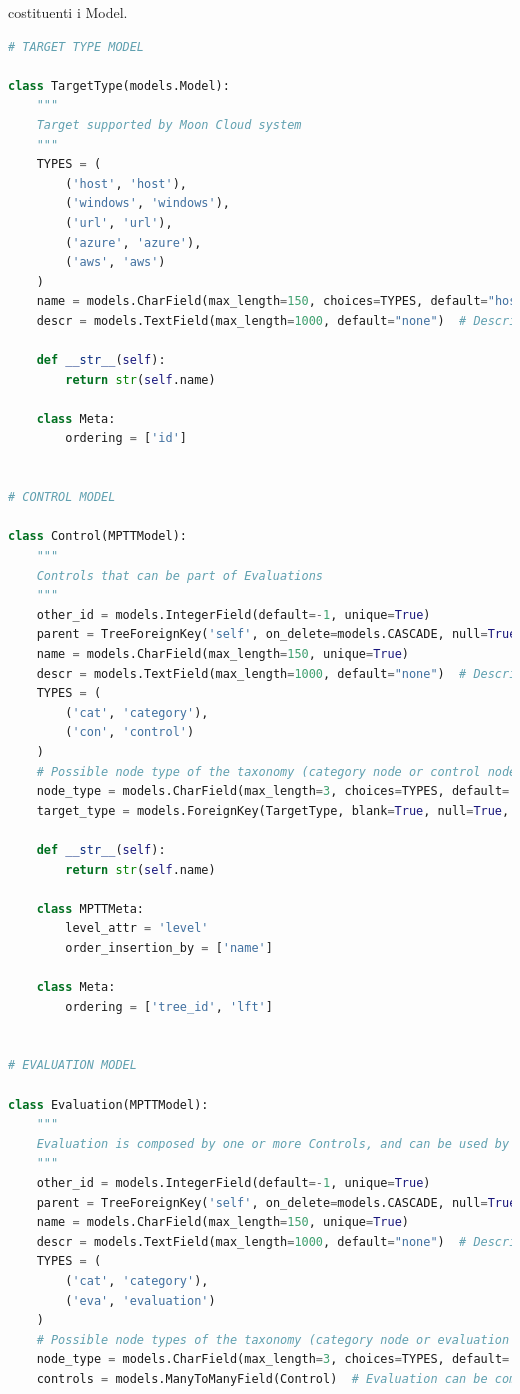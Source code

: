 costituenti i Model.
%
\lstset{style=python_code_style}
\begin{lstlisting}[language=Python, label=lst:model, caption={Parti principali del codice dei Models della soluzione.}]
# TARGET TYPE MODEL

class TargetType(models.Model):
    """
    Target supported by Moon Cloud system
    """
    TYPES = (
        ('host', 'host'),
        ('windows', 'windows'),
        ('url', 'url'),
        ('azure', 'azure'),
        ('aws', 'aws')
    )
    name = models.CharField(max_length=150, choices=TYPES, default="host")
    descr = models.TextField(max_length=1000, default="none")  # Description of a target

    def __str__(self):
        return str(self.name)

    class Meta:
        ordering = ['id']


# CONTROL MODEL

class Control(MPTTModel):
    """
    Controls that can be part of Evaluations
    """
    other_id = models.IntegerField(default=-1, unique=True)
    parent = TreeForeignKey('self', on_delete=models.CASCADE, null=True, blank=True, related_name='children')
    name = models.CharField(max_length=150, unique=True)
    descr = models.TextField(max_length=1000, default="none")  # Description of a node in the taxonomy
    TYPES = (
        ('cat', 'category'),
        ('con', 'control')
    )
    # Possible node type of the taxonomy (category node or control node)
    node_type = models.CharField(max_length=3, choices=TYPES, default='cat')
    target_type = models.ForeignKey(TargetType, blank=True, null=True, on_delete=models.CASCADE)  # It's null for the root node and category nodes

    def __str__(self):
        return str(self.name)

    class MPTTMeta:
        level_attr = 'level'
        order_insertion_by = ['name']

    class Meta:
        ordering = ['tree_id', 'lft']


# EVALUATION MODEL

class Evaluation(MPTTModel):
    """
    Evaluation is composed by one or more Controls, and can be used by Users
    """
    other_id = models.IntegerField(default=-1, unique=True)
    parent = TreeForeignKey('self', on_delete=models.CASCADE, null=True, blank=True, related_name='children')
    name = models.CharField(max_length=150, unique=True)
    descr = models.TextField(max_length=1000, default="none")  # Description of a node in the taxonomy
    TYPES = (
        ('cat', 'category'),
        ('eva', 'evaluation')
    )
    # Possible node types of the taxonomy (category node or evaluation node)
    node_type = models.CharField(max_length=3, choices=TYPES, default='cat')
    controls = models.ManyToManyField(Control)  # Evaluation can be composed of one or more controls


\end{lstlisting}
